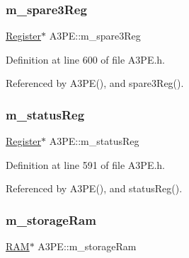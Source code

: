 \mbox{\label{classA3PE_a1e7e5c89f190672990ae5bece2a8b1aa}} 
\subsubsection{\texorpdfstring{m\+\_\+spare3\+Reg}{m\_spare3Reg}}
{\footnotesize\ttfamily \hyperlink{classRegister}{Register}$\ast$ A3\+P\+E\+::m\+\_\+spare3\+Reg\hspace{0.3cm}{\ttfamily [private]}}



Definition at line 600 of file A3\+P\+E.\+h.



Referenced by A3\+P\+E(), and spare3\+Reg().

\mbox{\label{classA3PE_a2281e3d12a2dffad99ec55be2b695f53}} 
\subsubsection{\texorpdfstring{m\+\_\+status\+Reg}{m\_statusReg}}
{\footnotesize\ttfamily \hyperlink{classRegister}{Register}$\ast$ A3\+P\+E\+::m\+\_\+status\+Reg\hspace{0.3cm}{\ttfamily [private]}}



Definition at line 591 of file A3\+P\+E.\+h.



Referenced by A3\+P\+E(), and status\+Reg().

\mbox{\label{classA3PE_a41e317474e0c6e63bad4648903279be9}} 
\subsubsection{\texorpdfstring{m\+\_\+storage\+Ram}{m\_storageRam}}
{\footnotesize\ttfamily \hyperlink{classRAM}{R\+AM}$\ast$ A3\+P\+E\+::m\+\_\+storage\+Ram\hspace{0.3cm}{\ttfamily [private]}}




